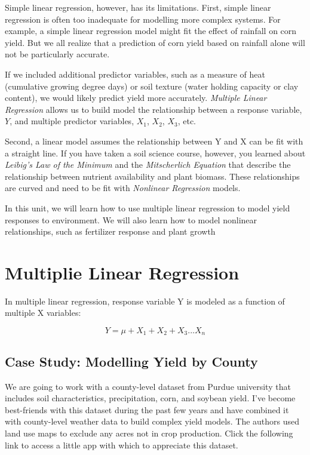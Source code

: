 \documentclass[
]{book}
\begin{document}
Simple linear regression, however, has its limitations. First, simple linear regression is often too inadequate for modelling more complex systems. For example, a simple linear regression model might fit the effect of rainfall on corn yield. But we all realize that a prediction of corn yield based on rainfall alone will not be particularly accurate.

If we included additional predictor variables, such as a measure of heat (cumulative growing degree days) or soil texture (water holding capacity or clay content), we would likely predict yield more accurately. \emph{Multiple Linear Regression} allows us to build model the relationship between a response variable, \(Y\), and multiple predictor variables, \(X_1\), \(X_2\), \(X_3\), etc.

Second, a linear model assumes the relationship between Y and X can be fit with a straight line. If you have taken a soil science course, however, you learned about \emph{Leibig's Law of the Minimum} and the \emph{Mitscherlich Equation} that describe the relationship between nutrient availability and plant biomass. These relationships are curved and need to be fit with \emph{Nonlinear Regression} models.

In this unit, we will learn how to use multiple linear regression to model yield responses to environment. We will also learn how to model nonlinear relationships, such as fertilizer response and plant growth

\hypertarget{multiplie-linear-regression}{%
\section{Multiplie Linear Regression}\label{multiplie-linear-regression}}

In multiple linear regression, response variable Y is modeled as a function of multiple X variables:

\[ Y = \mu + X_1 + X_2 + X_3 ... X_n\]

\hypertarget{case-study-modelling-yield-by-county}{%
\subsection{Case Study: Modelling Yield by County}\label{case-study-modelling-yield-by-county}}

We are going to work with a county-level dataset from Purdue university that includes soil characteristics, precipitation, corn, and soybean yield. I've become best-friends with this dataset during the past few years and have combined it with county-level weather data to build complex yield models. The authors used land use maps to exclude any acres not in crop production. Click the following link to access a little app with which to appreciate this dataset.
\end{document}
